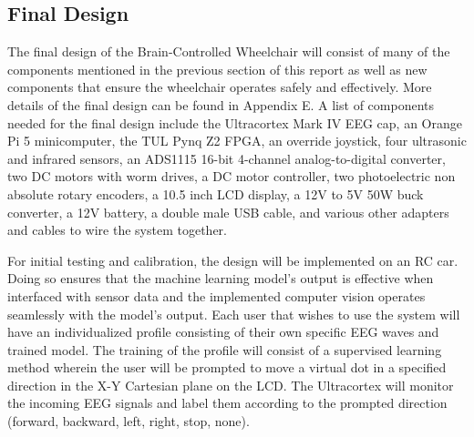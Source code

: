 \documentclass[conference]{IEEEtran}
\begin{document}
    \subsection{Final Design}
    The final design of the Brain-Controlled Wheelchair will consist of many of the components mentioned in the previous section of this report as well as new components that ensure the wheelchair operates safely and effectively. More details of the final design can be found in Appendix E. A list of components needed for the final design include the Ultracortex Mark IV EEG cap, an Orange Pi 5 minicomputer, the TUL Pynq Z2 FPGA, an override joystick, four ultrasonic and infrared sensors, an ADS1115 16-bit 4-channel analog-to-digital converter, two DC motors with worm drives, a DC motor controller, two photoelectric non absolute rotary encoders, a 10.5 inch LCD display, a 12V to 5V 50W buck converter, a 12V battery, a double male USB cable, and various other adapters and cables to wire the system together. 
    
    For initial testing and calibration, the design will be implemented on an RC car. Doing so ensures that the machine learning model's output is effective when interfaced with sensor data and the implemented computer vision operates seamlessly with the model's output. Each user that wishes to use the system will have an individualized profile consisting of their own specific EEG waves and trained model. The training of the profile will consist of a supervised learning method wherein the user will be prompted to move a virtual dot in a specified direction in the X-Y Cartesian plane on the LCD. The Ultracortex will monitor the incoming EEG signals and label them according to the prompted direction (forward, backward, left, right, stop, none). 
\end{document}
